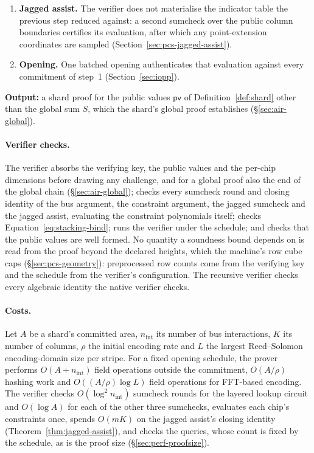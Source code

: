 \begin{protocol}
\begin{enumerate}
  (Section~\ref{sec:pcs-jagged}).
  \item \textbf{Jagged assist.} The verifier does not materialise the indicator table
  the previous step reduced against: a second sumcheck over the public column
  boundaries certifies its evaluation, after which any point-extension coordinates
  are sampled (Section~\ref{sec:pcs-jagged-assist}).
  \item \textbf{Opening.} One batched opening authenticates that evaluation
  against every commitment of step~1 (Section~\ref{sec:iopp}).
\end{enumerate}
\textbf{Output:} a shard proof for the public values $\mathsf{pv}$ of
Definition~\ref{def:shard} other than the global sum $S$, which the shard's
global proof establishes (\S\ref{sec:air-global}).
\end{protocol}

\paragraph{Verifier checks.} The verifier absorbs the verifying key, the public values and the per-chip dimensions before drawing any challenge, and for a global proof also the end of the global chain (\S\ref{sec:air-global}); checks every sumcheck round and closing identity of the bus argument, the constraint argument, the jagged sumcheck and the jagged assist, evaluating the constraint polynomials itself; checks Equation~\eqref{eq:stacking-bind}; runs the \WHIR{} verifier under the schedule; and checks that the public values are well formed. No quantity a soundness bound depends on is read from the proof beyond the declared heights, which the machine's row cube caps (\S\ref{sec:pcs-geometry}): preprocessed row counts come from the verifying key and the schedule from the verifier's configuration. The recursive verifier checks every algebraic identity the native verifier checks.

\paragraph{Costs.} Let $A$ be a shard's committed area, $n_{\mathrm{int}}$ its number of bus interactions, $K$ its number of columns, $\rho$ the initial encoding rate and $L$ the largest Reed--Solomon encoding-domain size per stripe. For a fixed opening schedule, the prover performs $O(A + n_{\mathrm{int}})$ field operations outside the commitment, $O(A/\rho)$ hashing work and $O((A/\rho)\log L)$ field operations for FFT-based encoding. The verifier checks $O(\log^2 n_{\mathrm{int}})$ sumcheck rounds for the layered lookup circuit and $O(\log A)$ for each of the other three sumchecks, evaluates each chip's constraints once, spends $O(mK)$ on the jagged assist's closing identity (Theorem~\ref{thm:jagged-assist}), and checks the \WHIR{} queries, whose count is fixed by the schedule, as is the proof size (\S\ref{sec:perf-proofsize}).

